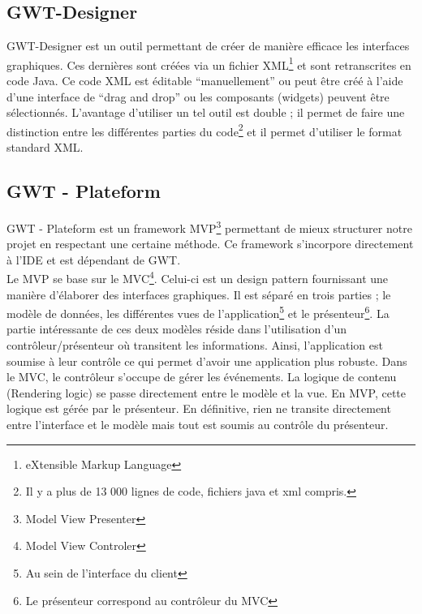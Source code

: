 \subsection{GWT-Designer}
GWT-Designer est un outil permettant de créer de manière efficace les interfaces graphiques. Ces dernières sont créées via un fichier XML\footnote{eXtensible Markup Language} et sont retranscrites en code Java. 
\newline
\indent
Ce code XML est éditable \enquote{manuellement} ou peut être créé à l'aide d'une interface de \enquote{drag and drop} ou les composants (widgets) peuvent être sélectionnés.
\newline
\indent
L'avantage d'utiliser un tel outil est double ; il permet de faire une distinction entre les différentes parties du code\footnote{Il y a plus de 13 000 lignes de code, fichiers java et xml compris.} et il permet d'utiliser le format standard XML.

\subsection{GWT - Plateform}
GWT - Plateform est un framework MVP\footnote{Model View Presenter} permettant de mieux structurer notre projet en respectant une certaine méthode. Ce framework s'incorpore directement à l'IDE et est dépendant de GWT.\\
\newline
\indent
Le MVP se base sur le MVC\footnote{Model View Controler}. Celui-ci est un design pattern fournissant une manière d'élaborer des interfaces graphiques. Il est séparé en trois parties ; le modèle de données, les différentes vues de l'application\footnote{Au sein de l'interface du client} et le présenteur\footnote{Le présenteur correspond au contrôleur du MVC}. 
\newline
\indent
La partie intéressante de ces deux modèles réside dans l'utilisation d'un contrôleur/présenteur où transitent les informations. Ainsi, l'application est soumise à leur contrôle ce qui permet d'avoir une application plus robuste. 
Dans le MVC, le contrôleur s'occupe de gérer les événements. La logique de contenu (Rendering logic) se passe directement entre le modèle et la vue. 
En MVP, cette logique est gérée par le présenteur. En définitive, rien ne transite directement entre l'interface et le modèle mais tout est soumis au contrôle du présenteur.


